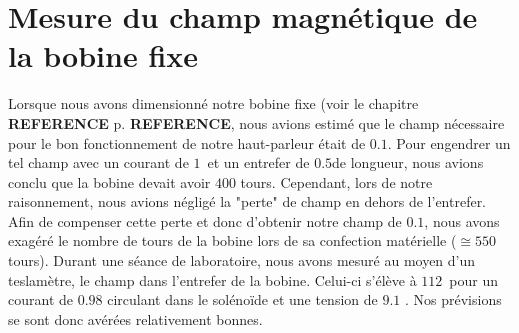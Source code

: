 \section{Mesure du champ magnétique de la bobine fixe}

Lorsque nous avons dimensionné notre bobine fixe (voir le chapitre \textbf{REFERENCE} p. \textbf{REFERENCE}, nous avions estimé que le champ nécessaire pour le bon fonctionnement de notre haut-parleur était de $0.1$\tesla.  Pour engendrer un tel champ avec un courant de $1$\ampere \, et un entrefer de $0.5$\centi \meter de longueur, nous avions conclu que la bobine devait avoir $400$ tours. Cependant, lors de notre raisonnement, nous avions négligé la "perte" de champ en dehors de l'entrefer. Afin de compenser cette perte et donc d'obtenir notre champ de $0.1$\tesla, nous avons exagéré le nombre de tours de la bobine lors de sa confection matérielle ($\cong 550$ tours). 
Durant une séance de laboratoire, nous avons mesuré au moyen d'un teslamètre, le champ dans l'entrefer de la bobine. Celui-ci s'élève à $112$\milli \tesla \, pour un courant de $0.98$ \ampere circulant dans le solénoïde et une tension de $9.1$ \volt. Nos prévisions se sont donc avérées relativement bonnes.

